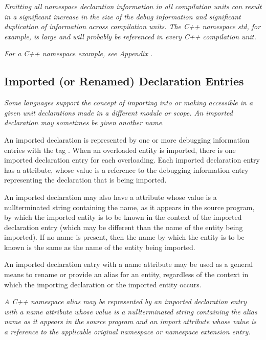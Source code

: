 \textit{Emitting all namespace declaration information in all
compilation units can result in a significant increase in the
size of the debug information and significant duplication of
information across compilation units. The C++ namespace std,
for example, is large and will probably be referenced in
every C++ compilation unit.
}

\textit{For a C++ namespace example, see Appendix .
}



\subsection{Imported (or Renamed) Declaration Entries} 
\label{chap:importedorrenameddeclarationentries}
\textit{Some languages support the concept of importing into or making
accessible in a given unit declarations made in a different
module or scope. An imported declaration may sometimes be
given another name.
}

An imported declaration is represented by one or
more debugging information entries with the 
tag . 
When an overloaded entity
is imported, there is one imported declaration entry for
each overloading. Each imported declaration entry has a
 attribute, whose value is a reference to the
debugging information entry representing the declaration that
is being imported.

An imported declaration may also have a  attribute
whose value is a null\dash terminated string containing the
name, as it appears in the source program, by which the
imported entity is to be known in the context of the imported
declaration entry (which may be different than the name of
the entity being imported). If no name is present, then the
name by which the entity is to be known is the same as the
name of the entity being imported.

An imported declaration entry with a name attribute may be
used as a general means to rename or provide an alias for
an entity, regardless of the context in which the importing
declaration or the imported entity occurs.

\textit{A C++ namespace alias may be represented by an imported
declaration entry with a name attribute whose value is
a null\dash terminated string containing the alias name as it
appears in the source program and an import attribute whose
value is a reference to the applicable original namespace or
namespace extension entry.
}

